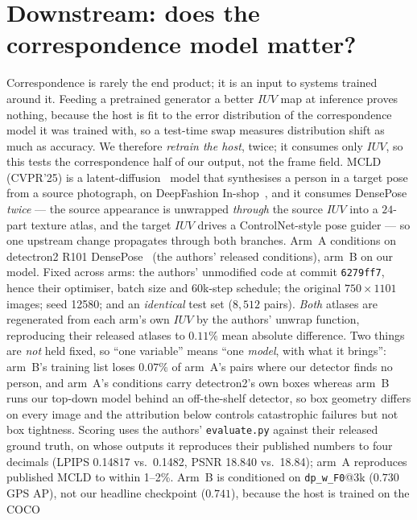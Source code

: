 \section{Downstream: does the correspondence model matter?}
\label{sec:exp_down}

Correspondence is rarely the end product; it is an input to systems trained around it. Feeding a
pretrained generator a better $IUV$ map at inference proves nothing, because the host is fit to the
error distribution of the correspondence model it was trained with, so a test-time swap measures
distribution shift as much as accuracy. We therefore \emph{retrain the host}, twice; it consumes
only $IUV$, so this tests the correspondence half of our output, not the frame field.
MCLD~\cite{mcld2025} (CVPR'25) is a latent-diffusion~\cite{rombach2022ldm} model that synthesises a
person in a target pose from a source photograph, on DeepFashion In-shop~\cite{liu2016deepfashion},
and it consumes DensePose \emph{twice} --- the source appearance is unwrapped \emph{through} the
source $IUV$ into a $24$-part texture atlas, and the target $IUV$ drives a ControlNet-style pose
guider --- so one upstream change propagates through both branches. Arm~A conditions on detectron2
R101 DensePose~\cite{guler2018densepose,wu2019detectron2} (the authors' released conditions), arm~B
on our model. Fixed across arms: the authors' unmodified code at commit \texttt{6279ff7}, hence their
optimiser, batch size and 60k-step schedule; the original $750\!\times\!1101$ images; seed 12580;
and an \emph{identical} test set ($8{,}512$ pairs). \emph{Both} atlases are regenerated from each
arm's own $IUV$ by the authors' unwrap function, reproducing their released atlases to $0.11\%$
mean absolute difference. Two things are \emph{not} held fixed, so ``one variable'' means ``one
\emph{model}, with what it brings'': arm~B's training list loses $0.07\%$ of arm~A's pairs where
our detector finds no person, and arm~A's conditions carry detectron2's own boxes whereas arm~B
runs our top-down model behind an off-the-shelf detector, so box geometry differs on every image
and the attribution below controls catastrophic failures but not box tightness. Scoring uses the
authors' \texttt{evaluate.py} against their released ground truth, on whose outputs it reproduces
their published numbers to four decimals (LPIPS 0.14817 vs.\ 0.1482, PSNR 18.840 vs.\ 18.84);
arm~A reproduces published MCLD to within 1--2\%. Arm~B is conditioned on \texttt{dp\_w\_F0}@3k
($0.730$ GPS AP), not our headline checkpoint ($0.741$), because the host is trained on the COCO
